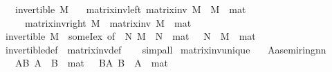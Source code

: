 \begin{isabellebody}
\ \ \ {\isachardoublequoteopen}invertible\ M{\isachardoublequoteclose}\isanewline
\ \ \ matrix{\isacharunderscore}{\kern0pt}inv{\isacharunderscore}{\kern0pt}left{\isacharcolon}{\kern0pt}\ {\isachardoublequoteopen}matrix{\isacharunderscore}{\kern0pt}inv\ M\ {\isacharasterisk}{\kern0pt}{\isacharasterisk}{\kern0pt}\ M\ {\isacharequal}{\kern0pt}\ mat\ {}{\isachardoublequoteclose}\isanewline
\ \ \ \ \ matrix{\isacharunderscore}{\kern0pt}inv{\isacharunderscore}{\kern0pt}right{\isacharcolon}{\kern0pt}\ {\isachardoublequoteopen}M\ {\isacharasterisk}{\kern0pt}{\isacharasterisk}{\kern0pt}\ matrix{\isacharunderscore}{\kern0pt}inv\ M\ {\isacharequal}{\kern0pt}\ mat\ {}{\isachardoublequoteclose}\isanewline
%
\isadelimproof
\ \ %
\endisadelimproof
%
\isatagproof
{}\isamarkupfalse%
\ {\isacartoucheopen}invertible\ M{\isacartoucheclose}\ \ someI{\isacharunderscore}{\kern0pt}ex\ {\isacharbrackleft}{\kern0pt}of\ {\isachardoublequoteopen}{\isasymlambda}\ N{\isachardot}{\kern0pt}\ M\ {\isacharasterisk}{\kern0pt}{\isacharasterisk}{\kern0pt}\ N\ {\isacharequal}{\kern0pt}\ mat\ {}\ {\isasymand}\ N\ {\isacharasterisk}{\kern0pt}{\isacharasterisk}{\kern0pt}\ M\ {\isacharequal}{\kern0pt}\ mat\ {}{\isachardoublequoteclose}{\isacharbrackright}{\kern0pt}\isanewline
\ \ \isamarkupfalse%
\ invertible{\isacharunderscore}{\kern0pt}def\ \ matrix{\isacharunderscore}{\kern0pt}inv{\isacharunderscore}{\kern0pt}def\isanewline
\ \ \isamarkupfalse%
\ simp{\isacharunderscore}{\kern0pt}all%
\endisatagproof
{\isafoldproof}%
%
\isadelimproof
\isanewline
%
\endisadelimproof
\isanewline
\isanewline
{}\isamarkupfalse%
\ matrix{\isacharunderscore}{\kern0pt}inv{\isacharunderscore}{\kern0pt}unique{\isacharcolon}{\kern0pt}\isanewline
\ \ \ A{\isacharcolon}{\kern0pt}{\isacharcolon}{\kern0pt}{\isachardoublequoteopen}{\isacharprime}{\kern0pt}a{\isacharcolon}{\kern0pt}{\isacharcolon}{\kern0pt}{\isacharbraceleft}{\kern0pt}semiring{\isacharunderscore}{\kern0pt}{}{\isacharbraceright}{\kern0pt}{\isacharcircum}{\kern0pt}{\isacharprime}{\kern0pt}n{\isacharcircum}{\kern0pt}{\isacharprime}{\kern0pt}n{\isachardoublequoteclose}\isanewline
\ \ \ AB{\isacharcolon}{\kern0pt}\ {\isachardoublequoteopen}A\ {\isacharasterisk}{\kern0pt}{\isacharasterisk}{\kern0pt}\ B\ {\isacharequal}{\kern0pt}\ mat\ {}{\isachardoublequoteclose}\ \ BA{\isacharcolon}{\kern0pt}\ {\isachardoublequoteopen}B\ {\isacharasterisk}{\kern0pt}{\isacharasterisk}{\kern0pt}\ A\ {\isacharequal}{\kern0pt}\ mat\ {}{\isachardoublequoteclose}\isanewline

\end{isabellebody}
